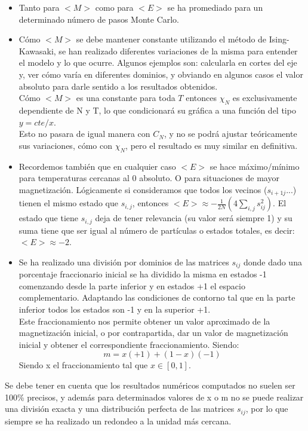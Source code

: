 \documentclass[12pt,paper]{article}
\begin{document}
\begin{itemize}
    \item Tanto para $<M>$ como para $<E>$ se ha promediado para un determinado número de pasos Monte Carlo.

    \item Cómo $<M>$ se debe mantener constante utilizando el método de Ising-Kawasaki, se han realizado diferentes variaciones de la misma para entender el modelo y lo que ocurre. Algunos ejemplos son: calcularla en cortes del eje y, ver cómo varía en diferentes dominios, y obviando en algunos casos el valor absoluto para darle sentido a los resultados obtenidos.\\
    Cómo $<M>$ es una constante para toda $T$ entonces $\chi_N$ es exclusivamente dependiente de N y T, lo que condicionará su gráfica a una función del tipo $y = cte/x$.\\
    Esto no pasara de igual manera con $C_N$, y no se podrá ajustar teóricamente sus variaciones, cómo con $\chi_N$, pero el resultado es muy similar en definitiva.
    
    \item Recordemos también que en cualquier caso $<E>$ se hace máximo/mínimo para temperaturas cercanas al 0 absoluto. O para situaciones de mayor magnetización. Lógicamente si consideramos que todos los vecinos ($s_{i+1j}...$) tienen el mismo estado que $s_{i,j}$, entonces $<E> \approx -\frac{1}{2N}(4 \sum_{i,j} s_{ij}^2)$. El estado que tiene $s_{i,j}$ deja de tener relevancia (su valor será siempre 1) y su suma tiene que ser igual al número de partículas o estados totales, es decir: $<E> \approx -2$.

    \item Se ha realizado una división por dominios de las matrices $s_{ij}$ donde dado una porcentaje fraccionario inicial se ha dividido la misma en estados -1 comenzando desde la parte inferior y en estados +1 el espacio complementario. Adaptando las condiciones de contorno tal que en la parte inferior todos los estados son -1 y en la superior +1.\\
    
    Este fraccionamiento nos permite obtener un valor aproximado de la magnetización inicial, o por contrapartida, dar un valor de magnetización inicial y obtener el correspondiente fraccionamiento. Siendo:
    \begin{equation}
        m = x(+1) + (1-x)(-1)
        \label{eq9}
    \end{equation}
    Siendo x el fraccionamiento tal que $x \in [0,1]$.
    
\end{itemize}
Se debe tener en cuenta que los resultados numéricos computados no suelen ser 100\% precisos, y además para determinados valores de x o m no se puede realizar una división exacta y una distribución perfecta de las matrices $s_{ij}$, por lo que siempre se ha realizado un redondeo a la unidad más cercana. 
\end{document}
